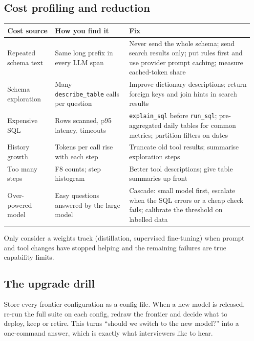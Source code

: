 \documentclass[11pt,a4paper]{article}
\newcommand{\code}[1]{\texttt{\small #1}}
\begin{document}
\subsection{Cost profiling and reduction}

\begin{center}
\small
\begin{tabularx}{\linewidth}{@{}l X X@{}}
\toprule
\textbf{Cost source} & \textbf{How you find it} & \textbf{Fix}\\
\midrule
Repeated schema text & Same long prefix in every LLM span & Never send the whole schema; send search results only; put rules first and use provider prompt caching; measure cached-token share\\
Schema exploration & Many \code{describe\_table} calls per question & Improve dictionary descriptions; return foreign keys and join hints in search results\\
Expensive SQL & Rows scanned, p95 latency, timeouts & \code{explain\_sql} before \code{run\_sql}; pre-aggregated daily tables for common metrics; partition filters on dates\\
History growth & Tokens per call rise with each step & Truncate old tool results; summarise exploration steps\\
Too many steps & F8 counts; step histogram & Better tool descriptions; give table summaries up front\\
Over-powered model & Easy questions answered by the large model & Cascade: small model first, escalate when the SQL errors or a cheap check fails; calibrate the threshold on labelled data\\
\bottomrule
\end{tabularx}
\end{center}

Only consider a weights track (distillation, supervised fine-tuning) when prompt and tool
changes have stopped helping and the remaining failures are true capability limits.

\subsection{The upgrade drill}

Store every frontier configuration as a config file. When a new model is released, re-run the
full suite on each config, redraw the frontier and decide what to deploy, keep or retire. This
turns ``should we switch to the new model?'' into a one-command answer, which is exactly what
interviewers like to hear.
\end{document}
